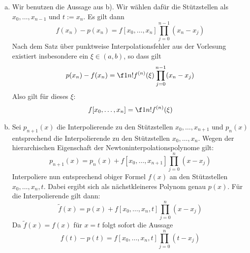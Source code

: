 \documentclass{mywork}
\begin{document}
\begin{aufgabe}
	\begin{enumerate}[a)]
		\item 
			Wir benutzen die Aussage aus b).
			Wir wählen dafür die Stützstellen als $x_0,\dotsc,x_{n-1}$ und $t:=x_n$.
			Es gilt dann
			\[
				f(x_n) - p(x_n) = f[x_0,\dotsc,x_n] \prod_{j=0}^{n-1} (x_n-x_j)
			\]
			Nach dem Satz über punktweise Interpolationsfehler aus der Vorlesung existiert insbesondere ein $\xi\in (a,b)$, so dass gilt
			\[
				p(x_n) - f(x_n) = \f 1{n!} f^{(n)}(\xi) \prod_{j=0}^{n-1} (x_n-x_j)
			\]
			Also gilt für dieses $\xi$:
			\[
				f[x_0,\dotsc,x_n] = \f 1{n!} f^{(n)}(\xi)
			\]
		\item
			Sei $p_{n+1}(x)$ die Interpolierende zu den Stützstellen $x_0,\dotsc,x_{n+1}$ und $p_{n}(x)$ entsprechend die Interpolierende zu den Stützstellen $x_0,\dotsc,x_n$.
			Wegen der hierarchischen Eigenschaft der Newtoninterpolationspolynome gilt:
			\[
				p_{n+1}(x) = p_n(x) + f[x_0,\dotsc,x_{n+1}]\prod_{j=0}^n (x-x_j)
			\]
			Interpoliere nun entsprechend obiger Formel $f(x)$ an den Stützstellen $x_0,\dotsc,x_n,t$.
			Dabei ergibt sich als nächstkleineres Polynom genau $p(x)$.
			Für die Interpolierende gilt dann:
			\[
				\tilde f(x) = p(x) + f[x_0,\dotsc,x_n,t]\prod_{j=0}^n (x-x_j)
			\]
			Da $\tilde f(x) = f(x)$ für $x=t$ folgt sofort die Aussage
			\[
				f(t) - p(t) = f[x_0,\dotsc,x_n,t] \prod_{j=0}^n (t-x_j)
			\]
	\end{enumerate}
\end{aufgabe}

\newpage
	\lstset{basicstyle=\scriptsize}
\setcounter{aufgabe}{3}
\end{document}
